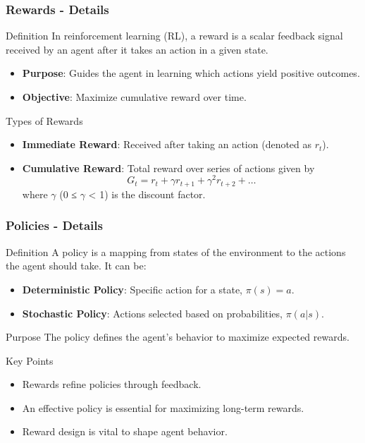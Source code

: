\documentclass[aspectratio=169]{beamer}
\begin{document}
\begin{frame}[fragile]
    \frametitle{Rewards - Details}
    \begin{block}{Definition}
        In reinforcement learning (RL), a reward is a scalar feedback signal received by an agent after it takes an action in a given state. 
    \end{block}
    \begin{itemize}
        \item \textbf{Purpose}: Guides the agent in learning which actions yield positive outcomes. 
        \item \textbf{Objective}: Maximize cumulative reward over time.
    \end{itemize}

    \begin{block}{Types of Rewards}
        \begin{itemize}
            \item \textbf{Immediate Reward}: Received after taking an action (denoted as \( r_t \)).
            \item \textbf{Cumulative Reward}: Total reward over series of actions given by
            \begin{equation}
                G_t = r_t + \gamma r_{t+1} + \gamma^2 r_{t+2} + \ldots
            \end{equation}
            where \( \gamma \) (0 ≤ \( \gamma \) < 1) is the discount factor.
        \end{itemize}
    \end{block}
\end{frame}

\begin{frame}[fragile]
    \frametitle{Policies - Details}
    \begin{block}{Definition}
        A policy is a mapping from states of the environment to the actions the agent should take. It can be:
    \end{block}
    \begin{itemize}
        \item \textbf{Deterministic Policy}: Specific action for a state, \( \pi(s) = a \).
        \item \textbf{Stochastic Policy}: Actions selected based on probabilities, \( \pi(a|s) \).
    \end{itemize}
    
    \begin{block}{Purpose}
        The policy defines the agent's behavior to maximize expected rewards.
    \end{block}

    \begin{block}{Key Points}
        \begin{itemize}
            \item Rewards refine policies through feedback.
            \item An effective policy is essential for maximizing long-term rewards.
            \item Reward design is vital to shape agent behavior.
        \end{itemize}
    \end{block}
\end{frame}
\end{document}
